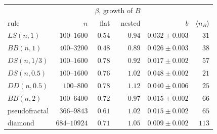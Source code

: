 \begin{center}
\small
\begin{tabular}{lrrrrr}
\hline
 & & \multicolumn{2}{c}{$\beta$, growth of $B$} & & \\
rule & $n$ & flat & nested & $b$ & $\langle n_B\rangle$\\
\hline
$LS(n,1)$ & $100$--$1600$ & $0.54$ & $0.94$ & $0.032\pm0.003$ & $31$\\
$BB(n,1)$ & $400$--$3200$ & $0.48$ & $0.89$ & $0.026\pm0.003$ & $38$\\
$DS(n,1/3)$ & $100$--$1600$ & $0.78$ & $0.92$ & $0.017\pm0.002$ & $57$\\
$DS(n,0.5)$ & $100$--$1600$ & $0.76$ & $1.02$ & $0.048\pm0.002$ & $21$\\
$DD(n,0.5)$ & $100$--$800$ & $0.78$ & $1.12$ & $0.040\pm0.006$ & $25$\\
$BB(n,2)$ & $100$--$6400$ & $0.72$ & $0.97$ & $0.015\pm0.002$ & $66$\\
\hline
pseudofractal & $366$--$9843$ & $0.61$ & $1.02$ & $0.015\pm0.002$ & $65$\\
diamond & $684$--$10924$ & $0.71$ & $1.05$ & $0.009\pm0.002$ & $113$\\
\hline
\end{tabular}
\end{center}
